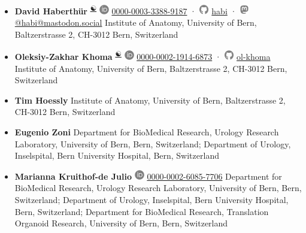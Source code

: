 \begin{itemize}
\item
  \textbf{David Haberthür}
  \textsuperscript{\protect\hyperlink{equal_contribution}{☯}}
  \includegraphics[width=0.16667in,height=0.16667in]{images/orcid.svg}
  \href{https://orcid.org/0000-0003-3388-9187}{0000-0003-3388-9187}
  · \includegraphics[width=0.16667in,height=0.16667in]{images/github.svg}
  \href{https://github.com/habi}{habi}
  · \includegraphics[width=0.16667in,height=0.16667in]{images/mastodon.svg}
  \href{https://mastodon.social/@habi}{@habi@mastodon.social}
  Institute of Anatomy, University of Bern, Baltzerstrasse 2, CH-3012 Bern, Switzerland
\item
  \textbf{Oleksiy-Zakhar Khoma}
  \textsuperscript{\protect\hyperlink{equal_contribution}{☯}}
  \includegraphics[width=0.16667in,height=0.16667in]{images/orcid.svg}
  \href{https://orcid.org/0000-0002-1914-6873}{0000-0002-1914-6873}
  · \includegraphics[width=0.16667in,height=0.16667in]{images/github.svg}
  \href{https://github.com/ol-khoma}{ol-khoma}
  Institute of Anatomy, University of Bern, Baltzerstrasse 2, CH-3012 Bern, Switzerland
\item
  \textbf{Tim Hoessly}
  Institute of Anatomy, University of Bern, Baltzerstrasse 2, CH-3012 Bern, Switzerland
\item
  \textbf{Eugenio Zoni}
  Department for BioMedical Research, Urology Research Laboratory, University of Bern, Bern, Switzerland; Department of Urology, Inselspital, Bern University Hospital, Bern, Switzerland
\item
  \textbf{Marianna Kruithof-de Julio}
  \includegraphics[width=0.16667in,height=0.16667in]{images/orcid.svg}
  \href{https://orcid.org/0000-0002-6085-7706}{0000-0002-6085-7706}
  Department for BioMedical Research, Urology Research Laboratory, University of Bern, Bern, Switzerland; Department of Urology, Inselspital, Bern University Hospital, Bern, Switzerland; Department for BioMedical Research, Translation Organoid Research, University of Bern, Bern, Switzerland

\end{itemize}
